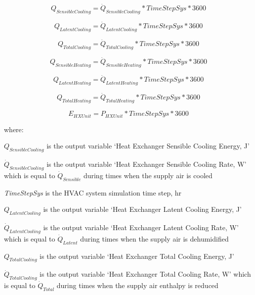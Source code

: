 \begin{equation}
{Q_{SensibleCooling}} = {\dot{Q}_{SensibleCooling}} * TimeStepSys * 3600
\end{equation}

\begin{equation}
{Q_{LatentCooling}} = {\dot{Q}_{LatentCooling}} * TimeStepSys * 3600
\end{equation}

\begin{equation}
{Q_{TotalCooling}} = {\dot{Q}_{TotalCooling}} * TimeStepSys * 3600
\end{equation}

\begin{equation}
{Q_{SensibleHeating}} = {\dot{Q}_{SensibleHeating}} * TimeStepSys * 3600
\end{equation}

\begin{equation}
{Q_{LatentHeating}} = {\dot{Q}_{LatentHeating}} * TimeStepSys * 3600
\end{equation}

\begin{equation}
{Q_{TotalHeating}} = {\dot{Q}_{TotalHeating}} * TimeStepSys * 3600
\end{equation}

\begin{equation}
{E_{HXUnit}} = {P_{HXUnit}} * TimeStepSys * 3600
\end{equation}

where: 

\(Q_{SensibleCooling}\) is the output variable `Heat Exchanger Sensible Cooling Energy, J'

\({\dot{Q}_{SensibleCooling}}\) is the output variable `Heat Exchanger Sensible Cooling Rate, W' which is equal to \({\dot{Q}_{Sensible}}\) during times when the supply air is cooled

\emph{TimeStepSys} is the HVAC system simulation time step, hr

\(Q_{LatentCooling}\) is the output variable `Heat Exchanger Latent Cooling Energy, J'

\({\dot{Q}_{LatentCooling}}\) is the output variable `Heat Exchanger Latent Cooling Rate, W' which is equal to \({\dot{Q}_{Latent}}\) during times when the supply air is dehumidified

\(Q_{TotalCooling}\) is the output variable `Heat Exchanger Total Cooling Energy, J'

\({\dot{Q}_{TotalCooling}}\) is the output variable `Heat Exchanger Total Cooling Rate, W' which is equal to \({\dot{Q}_{Total}}\) during times when the supply air enthalpy is reduced


